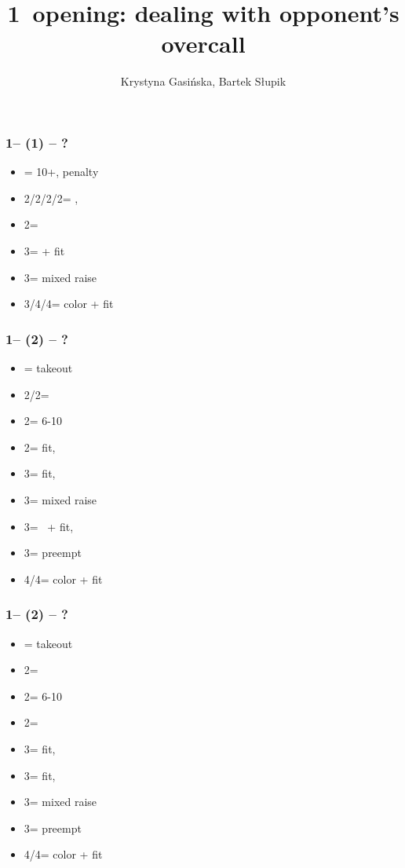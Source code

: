 \documentclass[12pt, a4paper]{article}
\title{1\spades\ opening: dealing with opponent's overcall}
\author{Krystyna Gasińska, Bartek Słupik}
\begin{document}
\maketitle


\subsubsection*{1\spades -- (1\nt) -- ?}
\begin{itemize}
    \item \dbl = 10+, penalty
    \item 2\clubs/2\diams/2\hearts/2\spades = \nat, \nf
    \item 2\nt = \minor
    \item 3\clubs = \inv + fit
    \item 3\diams = mixed raise
    \item 3\hearts/4\clubs/4\diams = color + fit
\end{itemize}

\subsubsection*{1\spades -- (2\clubs) -- ?}
\begin{itemize}
    \item \dbl = takeout
    \item 2\diams/2\hearts = \fonce
    \item 2\spades = 6-10
    \item 2\nt = fit, \gf
    \item 3\clubs = fit, \inv
    \item 3\diams = mixed raise
    \item 3\hearts = \hearts\ + fit, \inv
    \item 3\spades = preempt
    \item 4\diams/4\hearts = color + fit
\end{itemize}

\subsubsection*{1\spades -- (2\diams) -- ?}
\begin{itemize}
    \item \dbl = takeout
    \item 2\hearts = \fonce
    \item 2\spades = 6-10
    \item 2\nt = \clubs\ \invp
    \item 3\clubs = fit, \gf
    \item 3\diams = fit, \inv
    \item 3\hearts = mixed raise
    \item 3\spades = preempt
    \item 4\clubs/4\hearts = color + fit
\end{itemize}
\end{document}
